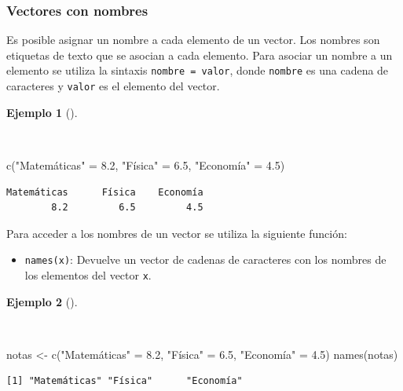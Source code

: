 \documentclass[
  a4paper,
]{scrreport}
\newenvironment{Shaded}{\begin{snugshade}}{\end{snugshade}}
\newcommand{\FloatTok}[1]{\textcolor[rgb]{0.68,0.00,0.00}{#1}}
\newcommand{\FunctionTok}[1]{\textcolor[rgb]{0.28,0.35,0.67}{#1}}
\newcommand{\NormalTok}[1]{\textcolor[rgb]{0.00,0.23,0.31}{#1}}
\newcommand{\OtherTok}[1]{\textcolor[rgb]{0.00,0.23,0.31}{#1}}
\newcommand{\StringTok}[1]{\textcolor[rgb]{0.13,0.47,0.30}{#1}}
\providecommand{\tightlist}{%
  \setlength{\itemsep}{0pt}\setlength{\parskip}{0pt}}\usepackage{longtable,booktabs,array}
\theoremstyle{definition}
\theoremstyle{definition}
\newtheorem{example}{Ejemplo}[chapter]
\theoremstyle{remark}
\begin{document}
\hypertarget{vectores-con-nombres}{%
\subsubsection{Vectores con nombres}\label{vectores-con-nombres}}

Es posible asignar un nombre a cada elemento de un vector. Los nombres
son etiquetas de texto que se asocian a cada elemento. Para asociar un
nombre a un elemento se utiliza la sintaxis \texttt{nombre\ =\ valor},
donde \texttt{nombre} es una cadena de caracteres y \texttt{valor} es el
elemento del vector.

\begin{example}[]\protect\hypertarget{exm-vectores-con-nombre}{}\label{exm-vectores-con-nombre}

~

\begin{Shaded}
\begin{Highlighting}[]
\FunctionTok{c}\NormalTok{(}\StringTok{"Matemáticas"} \OtherTok{=} \FloatTok{8.2}\NormalTok{, }\StringTok{"Física"} \OtherTok{=} \FloatTok{6.5}\NormalTok{, }\StringTok{"Economía"} \OtherTok{=} \FloatTok{4.5}\NormalTok{)}
\end{Highlighting}
\end{Shaded}

\begin{verbatim}
Matemáticas      Física    Economía 
        8.2         6.5         4.5 
\end{verbatim}

\end{example}

Para acceder a los nombres de un vector se utiliza la siguiente función:

\begin{itemize}
\tightlist
\item
  \texttt{names(x)}: Devuelve un vector de cadenas de caracteres con los
  nombres de los elementos del vector \texttt{x}.
\end{itemize}

\begin{example}[]\protect\hypertarget{exm-acceso-nombres-vector}{}\label{exm-acceso-nombres-vector}

~

\begin{Shaded}
\begin{Highlighting}[]
\NormalTok{notas }\OtherTok{\textless{}{-}} \FunctionTok{c}\NormalTok{(}\StringTok{"Matemáticas"} \OtherTok{=} \FloatTok{8.2}\NormalTok{, }\StringTok{"Física"} \OtherTok{=} \FloatTok{6.5}\NormalTok{, }\StringTok{"Economía"} \OtherTok{=} \FloatTok{4.5}\NormalTok{)}
\FunctionTok{names}\NormalTok{(notas)}
\end{Highlighting}
\end{Shaded}

\begin{verbatim}
[1] "Matemáticas" "Física"      "Economía"   
\end{verbatim}

\end{example}
\end{document}
